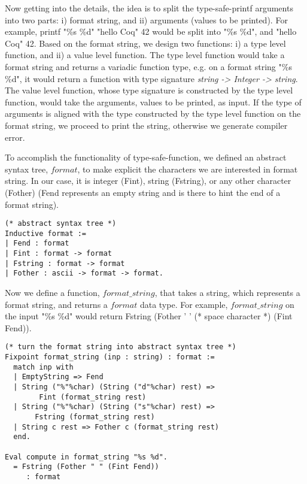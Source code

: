  Now getting into the details,  the idea is to split the type-safe-printf arguments into two parts: i) format string, 
 and ii) arguments (values to be printed).  For example, printf "\%s \%d" "hello Coq" 42 would be split into "\%s \%d",  and 
 "hello Coq" 42.  Based on the format string, we design two functions: i) a type level function, 
 and ii) a value level function.  The type level function would 
 take a format string and returns a variadic function type, e.g. 
 on  a format string "\%s \%d", it would return a function with type 
 signature \textit{string -> Integer  -> string}.
 The value level function, whose type signature 
 is constructed by the type level function, would take the arguments, values to be printed, as input. If the 
 type of arguments is aligned with the type constructed by the type level function on the format string,
 we proceed to print the string, otherwise we generate compiler error.  
 


To accomplish the functionality of type-safe-function,  we defined an abstract syntax tree,  $format$, to make explicit the characters we 
are interested in format string.  In our case, it is integer (Fint), string (Fstring), or any other character (Fother) (Fend represents an empty string
and is there to hint the end of a format string).


\begin{verbatim}
(* abstract syntax tree *)
Inductive format :=
| Fend : format
| Fint : format -> format
| Fstring : format -> format
| Fother : ascii -> format -> format.
\end{verbatim}

\noindent
Now we define a function,  $format\_string$, that takes a string, which represents a format string, 
and returns a $format$ data type.  For example,  $format\_string$ on the input  "\%s \%d" would return 
Fstring (Fother ' ' (* space character *) (Fint Fend)). 

\begin{verbatim}
(* turn the format string into abstract syntax tree *)
Fixpoint format_string (inp : string) : format :=
  match inp with
  | EmptyString => Fend
  | String ("%"%char) (String ("d"%char) rest) => 
        Fint (format_string rest)
  | String ("%"%char) (String ("s"%char) rest) => 
       Fstring (format_string rest)
  | String c rest => Fother c (format_string rest)
  end.
  
Eval compute in format_string "%s %d".
  = Fstring (Fother " " (Fint Fend))
     : format  
\end{verbatim}

